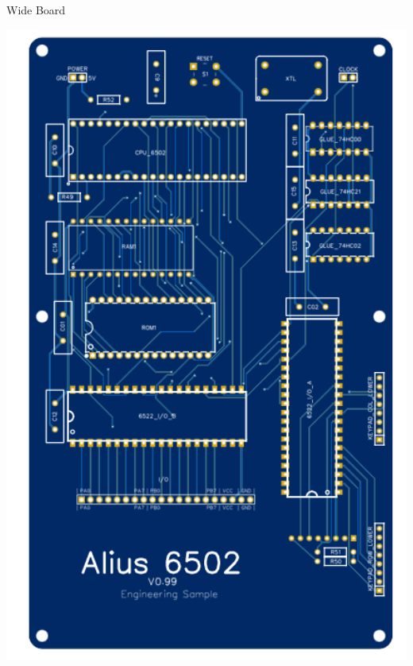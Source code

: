 \documentclass{ol-softwaremanual}
\begin{document}
\begin{ffcode}
\begin{center}
Wide Board
\end{center}
\pagebreak

\begin{center}
\includegraphics[angle=-90,width=13.5cm]{Bottom_Board.PNG}


\end{center}
\end{ffcode}
\end{document}
